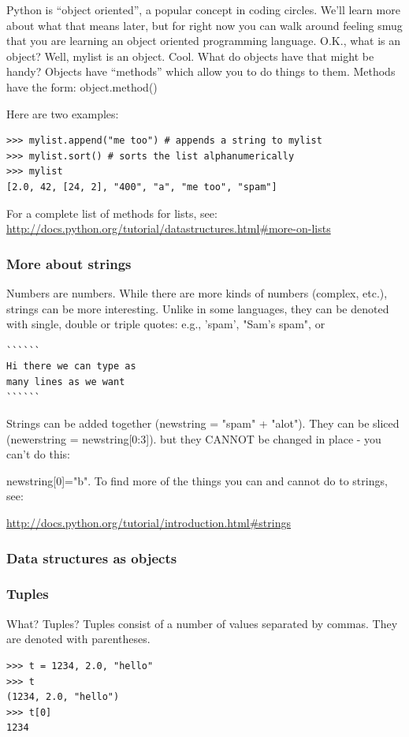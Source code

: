 \documentclass[11pt]{book}
\begin{document}
{{{Python is ``object oriented'', a popular concept in coding circles.  We'll learn more about what that means later, but for right now you can walk around feeling smug that you are learning an object oriented programming language.   O.K., what is an object?  Well,
{\color{blue}mylist} is an object.   Cool.  What do objects have that might be handy?
Objects have ``methods'' which allow you to do things to them.  Methods have the form:
{\color{blue}object.method()}

\noindent
Here are two examples:

{ \color{blue} \begin{verbatim}
>>> mylist.append("me too") # appends a string to mylist
>>> mylist.sort() # sorts the list alphanumerically
>>> mylist
[2.0, 42, [24, 2], "400", "a", "me too", "spam"]
\end{verbatim}}


\noindent

 For a complete list of methods for lists, see:
\url{http://docs.python.org/tutorial/datastructures.html#more-on-lists}

\subsubsection{More about strings}
Numbers are numbers. While there are more kinds of numbers (complex, etc.),
strings can be  more interesting. Unlike in some languages, they can be denoted with single, double or triple quotes:  e.g.,
'spam',  "Sam's spam", or
{ \color{blue} \begin{verbatim}
``````
Hi there we can type as
many lines as we want
``````
\end{verbatim}}

Strings can be added together ({\color{blue}newstring = "spam" + "alot"}).  They  can be sliced ({\color{blue}newerstring = newstring[0:3]}).
but they CANNOT be changed in place - you can't do this: {{\color{blue}newstring[0]="b"}.
To find more of the things you can and cannot do to strings, see:

\url{http://docs.python.org/tutorial/introduction.html#strings}

\subsubsection{Data structures as objects}



\subsubsection{Tuples}
What?  Tuples?
Tuples consist of a number of values separated by commas.  They are denoted with parentheses.
{ \color{blue} \begin{verbatim}
>>> t = 1234, 2.0, "hello"
>>> t
(1234, 2.0, "hello")
>>> t[0]
1234
\end{verbatim}}

}}}}
\end{document}
